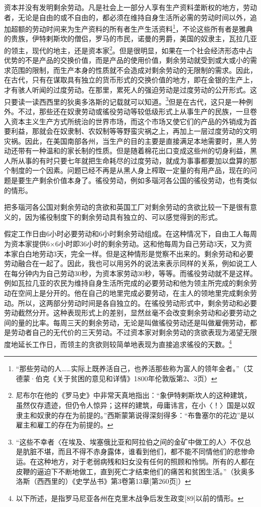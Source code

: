 \documentclass{ctexbook}
\begin{document}
    资本并没有发明剩余劳动。凡是社会上一部分人享有生产资料垄断权的地方，劳动者，无论是自由的或不自由的，都必须在维持自身生活所必需的劳动时间以外，追加超额的劳动时间来为生产资料的所有者生产生活资料\footnote{“那些劳动的人……实际上既养活自己，也养活那些称为富人的领年金者。”（艾德蒙·伯克《关于贫困的意见和详情》1800年伦敦版第2、3页）}，不论这些所有者是雅典的贵族，伊特剌斯坎的僧侣，罗马的市民，诺曼的男爵，美国的奴隶主，瓦拉几亚的领主，现代的地主，还是资本家\footnote{尼布尔在他的《罗马史》中非常天真地指出：“象伊特剌斯坎人的这种建筑，虽然仅存遗迹，但仍令人惊异；这样的建筑，毋庸讳言，在小〈！〉国是以奴隶主和奴隶的存在为前提的。”西斯蒙第说得深刻得多：“布鲁塞尔的花边”是以雇主和雇工的存在为前提的。}。但是很明显，如果在一个社会经济形态中占优势的不是产品的交换价值，而是产品的使用价值，剩余劳动就受到或大或小的需求范围的限制，而生产本身的性质就不会造成对剩余劳动的无限制的需求。因此，在古代，只有在谋取具有独立的货币形式的交换价值的地方，即在金银的生产上，才有骇人听闻的过度劳动。在那里，累死人的强迫劳动是过度劳动的公开形式。这只要读一读西西里的狄奥多洛斯的记载就可以知道。\footnote{“这些不幸者〈在埃及、埃塞俄比亚和阿拉伯之间的金矿中做工的人〉不仅总是肮脏不堪，而且不得不赤身露体，谁看到他们，都不能不同情他们的悲惨命运。在这种地方，对于老弱病残和妇女没有任何的照顾和怜悯。所有的人都在皮鞭的逼迫下不断地做工，直到死亡才结束他们的痛苦和贫困生活。”（狄奥多洛斯（西西里的）《史学丛书》第3卷第13章[第260页]）}但是在古代，这只是一种例外。不过，那些还在奴隶劳动或徭役劳动等较低级形式上从事生产的民族，一旦卷入资本主义生产方式所统治的世界市场，而这个市场又使它们的产品的外销成为首要利益，那就会在奴隶制、农奴制等等野蛮灾祸之上，再加上一层过度劳动的文明灾祸。因此，在美国南部各州，当生产的目的主要是直接满足本地需要时，黑人劳动还带有一种温和的家长制的性质。但是随着棉花出口变成这些州的切身利益，黑人所从事的有时只要七年就把生命耗尽的过度劳动，就成为事事都要加以盘算的那个制度的一个因素。问题已经不再是从黑人身上榨取一定量的有用产品，现在的问题是要生产剩余价值本身了。徭役劳动，例如多瑙河各公国的徭役劳动，也有类似的情形。

    把多瑙河各公国对剩余劳动的贪欲和英国工厂对剩余劳动的贪欲比较一下是很有意义的，因为徭役制度下的剩余劳动具有独立的、可以感觉得到的形式。

    假定工作日由6小时必要劳动和6小时剩余劳动组成。在这种情况下，自由工人每周为资本家提供6×6小时即36小时的剩余劳动。这和他每周为自己劳动3天，又为资本家白白地劳动3天，完全一样。但是这种情形是觉察不出来的。剩余劳动和必要劳动融合在一起了。因此，我也可以用另外的说法来表示同样的关系，例如说工人在每分钟内为自己劳动30秒，为资本家劳动30秒，等等。而徭役劳动就不是这样。例如瓦拉几亚的农民为维持自身生活所完成的必要劳动和他为领主所完成的剩余劳动在空间上是分开的。他在自己的地里完成必要劳动，在主人的领地里完成剩余劳动。所以，这两部分劳动时间是各自独立的。在徭役劳动形式中，剩余劳动和必要劳动截然分开。这种表现形式上的差别，显然丝毫不会改变剩余劳动和必要劳动之间的量的比率。每周三天的剩余劳动，无论是叫做徭役劳动还是叫做雇佣劳动，都是劳动者自己的无代价的三天劳动。不过资本家对剩余劳动的贪欲表现为渴望无限度地延长工作日，而领主的贪欲则较简单地表现为直接追求徭役的天数。\footnote{以下所述，是指罗马尼亚各州在克里木战争后发生政变[89]以前的情形。}
\end{document}
